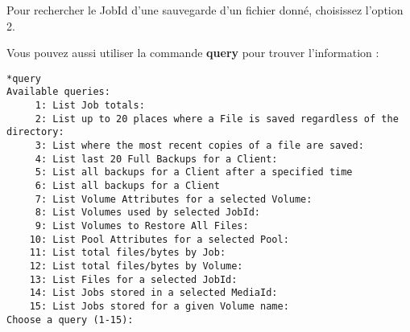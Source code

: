 \begin{description}
  Pour rechercher le JobId d'une sauvegarde d'un fichier donn\'e, choisissez 
  l'option 2.

  Vous pouvez aussi utiliser la commande {\bf query} pour trouver l'information :

\footnotesize
\begin{verbatim}
*query
Available queries:
     1: List Job totals:
     2: List up to 20 places where a File is saved regardless of the directory:
     3: List where the most recent copies of a file are saved:
     4: List last 20 Full Backups for a Client:
     5: List all backups for a Client after a specified time
     6: List all backups for a Client
     7: List Volume Attributes for a selected Volume:
     8: List Volumes used by selected JobId:
     9: List Volumes to Restore All Files:
    10: List Pool Attributes for a selected Pool:
    11: List total files/bytes by Job:
    12: List total files/bytes by Volume:
    13: List Files for a selected JobId:
    14: List Jobs stored in a selected MediaId:
    15: List Jobs stored for a given Volume name:
Choose a query (1-15):
\end{verbatim}
\normalsize


\end{description}
